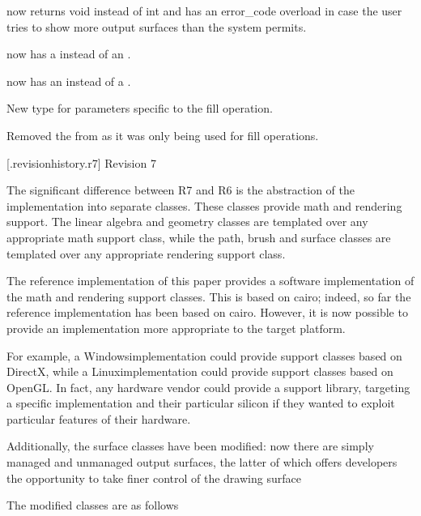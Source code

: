 \pnum
{} now returns void instead of int and has an error_code overload in case the user tries to show more output surfaces than the system permits.

\pnum
{} now has a  instead of an .

\pnum
{} now has an  instead of a .

\pnum
New type  for parameters specific to the fill operation.

\pnum
Removed the  from  as it was only being used for fill operations.

 [\iotwod.revisionhistory.r7] {Revision 7}

\pnum
The significant difference between R7 and R6 is the abstraction of the implementation into separate classes. These classes provide math and rendering support. The linear algebra and geometry classes are templated over any appropriate math support class, while the path, brush and surface classes are templated over any appropriate rendering support class.

\pnum
The reference implementation of this paper provides a software implementation of the math and rendering support classes. This is based on cairo; indeed, so far the reference implementation has been based on cairo. However, it is now possible to provide an implementation more appropriate to the target platform.

\pnum
For example, a Windows\textregistered implementation could provide support classes based on DirectX\textregistered, while a Linux\textregistered implementation could provide support classes based on OpenGL\textregistered. In fact, any hardware vendor could provide a support library, targeting a specific implementation and their particular silicon if they wanted to exploit particular features of their hardware.

\pnum
Additionally, the surface classes have been modified: now there are simply managed and unmanaged output surfaces, the latter of which offers developers the opportunity to take finer control of the drawing surface

\pnum
The modified classes are as follows

